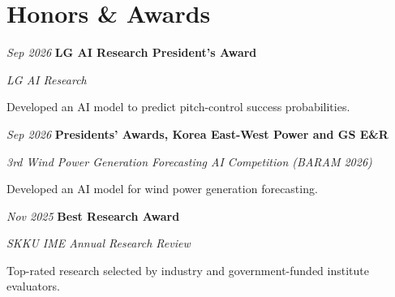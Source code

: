 \section{Honors \& Awards}

\begingroup\normalsize

\begin{samepage}
    \begin{twocolentry}{\textit{Sep 2026}}
        \textbf{LG AI Research President's Award}\href{https://dacon.io/competitions/official/236767/overview/description}{}
        \par\textit{LG AI Research}
    \end{twocolentry}
    \begin{onecolentry}
        \begin{highlights}
            \item Developed an AI model to predict pitch-control success probabilities.
        \end{highlights}
    \end{onecolentry}
\end{samepage}

\vspace{0.08cm}

\begin{samepage}
    \begin{twocolentry}{\textit{Sep 2026}}
        \textbf{Presidents' Awards, Korea East-West Power and GS E\&R}\href{https://dacon.io/competitions/official/236727/overview/description}{}
        \par\textit{3rd Wind Power Generation Forecasting AI Competition (BARAM 2026)}
    \end{twocolentry}
    \begin{onecolentry}
        \begin{highlights}
            \item Developed an AI model for wind power generation forecasting.
        \end{highlights}
    \end{onecolentry}
\end{samepage}

\vspace{0.08cm}

\begin{samepage}
    \begin{twocolentry}{\textit{Nov 2025}}
        \textbf{Best Research Award}
        \par\textit{SKKU IME Annual Research Review}
    \end{twocolentry}
    \begin{onecolentry}
        \begin{highlights}
            \item Top-rated research selected by industry and government-funded institute evaluators.
        \end{highlights}
    \end{onecolentry}
\end{samepage}

